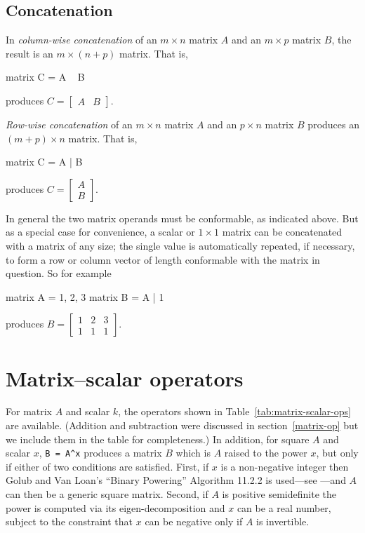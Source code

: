\subsection{Concatenation}

In \textit{column-wise concatenation} of an $m\times n$ matrix $A$ and
an $m\times p$ matrix $B$, the result is an $m\times (n+p)$ matrix.
That is,
%
\begin{code}
matrix C = A ~ B
\end{code}
% 
produces $C = \left[ \begin{array}{cc} A & B \end{array} \right]$.

\textit{Row-wise concatenation} of an $m\times n$ matrix $A$ and
an $p\times n$ matrix $B$ produces an $(m+p) \times n$ matrix.
That is,
%
\begin{code}
matrix C = A | B
\end{code}
% 
produces $C = \left[ \begin{array}{cc} A \\ B \end{array} \right]$.

In general the two matrix operands must be conformable, as indicated
above. But as a special case for convenience, a scalar or $1 \times 1$
matrix can be concatenated with a matrix of any size; the single value
is automatically repeated, if necessary, to form a row or column
vector of length conformable with the matrix in question. So for
example
%
\begin{code}
matrix A = {1, 2, 3}
matrix B = A | 1
\end{code}
%
produces $B = \left[ \begin{array}{ccc} 1 & 2 & 3 \\
  1 & 1 & 1 \end{array} \right]$.

\section{Matrix--scalar operators}
\label{matrix-scalar-op}

For matrix $A$ and scalar $k$, the operators shown in
Table~\ref{tab:matrix-scalar-ops} are available.  (Addition and
subtraction were discussed in section~\ref{matrix-op} but we include
them in the table for completeness.)  In addition, for square $A$ and
scalar $x$, \verb|B = A^x| produces a matrix $B$ which is $A$ raised
to the power $x$, but only if either of two conditions are
satisfied. First, if $x$ is a non-negative integer then Golub and Van
Loan's ``Binary Powering'' Algorithm 11.2.2 is used---see
\cite{golub96}---and $A$ can then be a generic square matrix. Second,
if $A$ is positive semidefinite the power is computed via its
eigen-decomposition and $x$ can be a real number, subject to the
constraint that $x$ can be negative only if $A$ is invertible.

